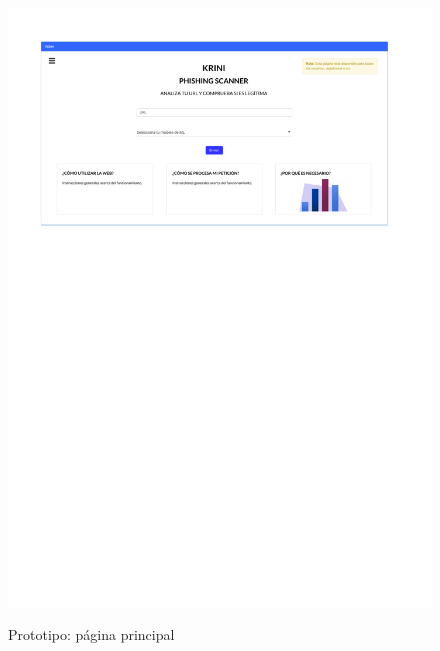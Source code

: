 \begin{figure}[h]
	\caption{Prototipo: página principal}
	\centering
	\includegraphics[width=\textwidth]{../img/anexos/mockups/1-mockups-index}
	\label{mock:index}
\end{figure}

